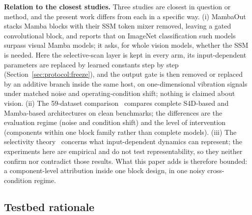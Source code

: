 \textbf{Relation to the closest studies.} Three studies are closest in question or method, and the present work differs from each in a specific way. (i) MambaOut~\cite{yu2024mambaout} stacks Mamba blocks with their SSM token mixer removed, leaving a gated convolutional block, and reports that on ImageNet classification such models surpass visual Mamba models; it asks, for whole vision models, whether the SSM is needed. Here the selective-scan layer is kept in every arm, its input-dependent parameters are replaced by learned constants step by step (Section~\ref{sec:protocol:freeze}), and the output gate is then removed or replaced by an additive branch inside the same host, on one-dimensional vibration signals under matched noise and operating-condition shift; nothing is claimed about vision. (ii) The 59-dataset comparison~\cite{saadatmand2026s4d} compares complete S4D-based and Mamba-based architectures on clean benchmarks; the differences are the evaluation regime (noise and condition shift) and the level of intervention (components within one block family rather than complete models). (iii) The selectivity theory~\cite{huang2025selectivity,yu2025blockbiased} concerns what input-dependent dynamics can represent; the experiments here are empirical and do not test representability, so they neither confirm nor contradict those results. What this paper adds is therefore bounded: a component-level attribution inside one block design, in one noisy cross-condition regime.

\subsection{Testbed rationale}
\label{sec:background:testbed}

